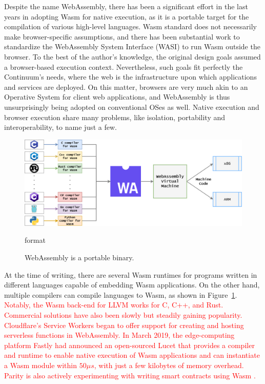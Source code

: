 Despite the name WebAssembly, there has been a significant effort in the last years in adopting Wasm for native execution, as it is a portable target for the compilation of various high-level languages. Wasm standard does not necessarily make browser-specific assumptions, and there has been substantial work to standardize the WebAssembly System Interface (WASI) to run Wasm outside the browser. To the best of the author's knowledge, the original design goals assumed a browser-based execution context. Nevertheless, such goals fit perfectly the Continuum's needs, where the web is the infrastructure upon which applications and services are deployed. On this matter, browsers are very much akin to an Operative System for client web applications, and WebAssembly is thus unsurprisingly being adopted on conventional OSes as well. Native execution and browser execution share many problems, like isolation, portability and interoperability, to name just a few.

\begin{figure}[ht]
\centering
\includegraphics[width=\columnwidth]{figures/portability}
\caption{WebAssembly is a portable binary.} format \label{fig:portability}
\end{figure}

At the time of writing, there are several Wasm runtimes for programs written in different languages capable of embedding Wasm applications. On the other hand, multiple compilers can compile languages to Wasm, as shown in Figure~\ref{fig:portability}. \textcolor{red}{Notably, the Wasm back-end for LLVM \cite{llvm} works for C, C++, and Rust. Commercial solutions have also been slowly but steadily gaining popularity. Cloudflare's Service Workers \cite{cloudflare-workers} began to offer support for creating and hosting serverless functions in WebAssembly. In March 2019, the edge-computing platform Fastly had announced an open-sourced Lucet \cite{fastly-lucet} that provides a compiler and runtime to enable native execution of Wasm applications and can instantiate a Wasm module within $50\mu s$, with just a few kilobytes of memory overhead. Parity is also actively experimenting with writing smart contracts using Wasm \cite{parity-wasm}.}

